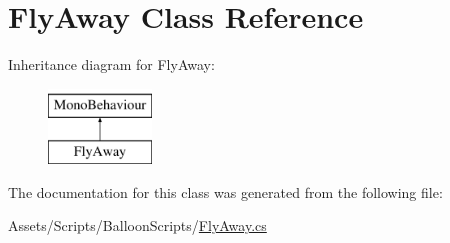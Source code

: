 \hypertarget{classFlyAway}{}\section{Fly\+Away Class Reference}
\label{classFlyAway}
Inheritance diagram for Fly\+Away\+:\begin{figure}[H]
\begin{center}
\leavevmode
\includegraphics[height=2.000000cm]{classFlyAway}
\end{center}
\end{figure}


The documentation for this class was generated from the following file\+:\begin{DoxyCompactItemize}
\item 
Assets/\+Scripts/\+Balloon\+Scripts/\hyperlink{FlyAway_8cs}{Fly\+Away.\+cs}\end{DoxyCompactItemize}
